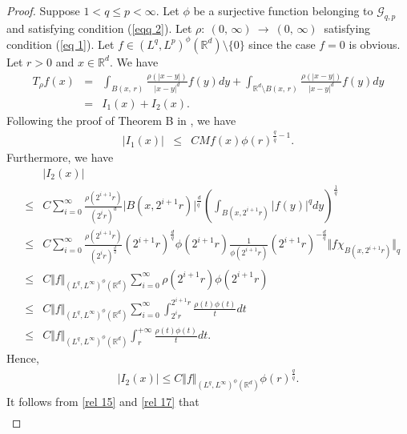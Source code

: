 \documentclass[10pt,a4paper]{amsart}
\numberwithin{equation}{section}
\numberwithin{equation}{section}
\begin{document}
\begin{proof}
Suppose $1 < q\leq p < \infty$. Let $\phi$ be a surjective function belonging to $ \mathcal{G}_{q,p}$ and satisfying condition (\ref{eqq 2}). Let $\rho : \: (0,\, \infty) \:  \to \: (0,\, \infty) \:$ satisfying condition (\ref{eq 1}).  Let $f \in (L^{q},L^{p})^{\phi}(\mathbb{R}^{d})\setminus \{ 0 \}$ since the case $f=0$ is obvious. Let $r>0$ and $x \in \mathbb{R}^{d}$. We have
\begin{eqnarray*}
 T_{\rho} f(x)&=&\displaystyle\int_{B(x,\, r)}\frac{\rho(\left|x-y\right|)}{\left|x-y\right|^{d}}f(y)dy+\displaystyle\int_{\mathbb{R}^{d}\setminus B(x,\, r)}\frac{\rho(\left|x-y\right|)}{\left|x-y\right|^{d}}f(y)dy\\ &=& I_{1}(x) + I_{2}(x) . 
\end{eqnarray*}
Following the proof of Theorem B in \cite{GE0}, we have
\begin{eqnarray}  \label{rel 15}
 \vert I_{1}(x) \vert & \leq &  C M f(x) \phi(r)^{\frac{q}{\bar{q}}-1}.
\end{eqnarray}
Furthermore, we have
\begin{eqnarray*}
& &\vert I_{2}(x) \vert  \\
& \leq & C\sum\limits^{\infty}_{i=0}\frac{\rho(2^{i+1}r)}{(2^{i}r)^{d}} \vert B(x,2^{i+1}r) \vert^{\frac{d}{q^{'}}} \left( \displaystyle\int_{B(x,2^{i+1}r)} \vert f(y)\vert^{q} dy\right)^{\frac{1}{q}}\\
 &\leq & C \sum\limits^{\infty}_{i=0}\frac{\rho(2^{i+1}r)}{(2^{i}r)^{\frac{d}{q}}} (2^{i+1}r)^{\frac{d}{q}} \phi(2^{i+1}r)\frac{1}{\phi(2^{i+1}r)}(2^{i+1}r)^{-\frac{d}{q}} \Vert f \chi_{B(x,2^{i+1}r)}   \Vert_{q} \\
 &\leq & C \Vert f \Vert_{(L^{q},L^{\infty})^{\phi}(\mathbb{R}^{d})}\sum\limits^{\infty}_{i=0} \rho(2^{i+1}r) \phi(2^{i+1}r)\\&\leq & C \Vert f \Vert_{(L^{q},L^{\infty})^{\phi}(\mathbb{R}^{d})}\sum\limits^{\infty}_{i=0} \displaystyle\int_{2^{i}r}^{2^{i+1}r} \frac{\rho(t)\phi(t)}{t} dt \\&\leq & C \Vert f \Vert_{(L^{q},L^{\infty})^{\phi}(\mathbb{R}^{d})}\displaystyle\int_{r}^{+\infty} \frac{\rho(t)\phi(t)}{t} dt.
\end{eqnarray*}
Hence,
\begin{eqnarray}\label{rel 17}
\vert I_{2}(x) \vert \leq C \Vert f \Vert_{(L^{q},L^{\infty})^{\phi}(\mathbb{R}^{d})}\phi(r)^{\frac{q}{\bar{q}}}.
\end{eqnarray}
It follows from \eqref{rel 15} and \eqref{rel 17} that
\begin{eqnarray*}

\end{eqnarray*}
\end{proof}
\end{document}
